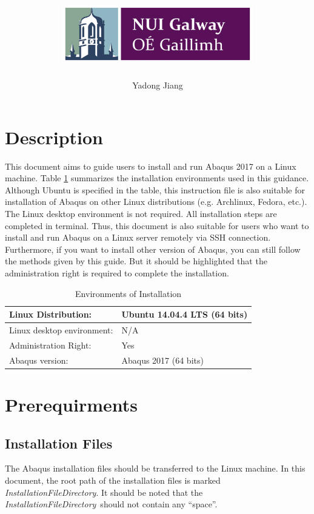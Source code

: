 \documentclass[12pt]{article}
\title{\includegraphics[height=1in]{Figures/NUIG_Logo.jpg}\\ \tit}
\author[1]{Yadong Jiang}
\affil[1]{College of Engineering and Informatics, National University of Ireland Galway}
\date{}
\newcommand{\ifp}{\textit{InstallationFileDirectory}}
\begin{document}
\maketitle

\newpage

\section*{Description}
This document aims to guide users to install and run Abaqus 2017 on a Linux machine. Table \ref{tb-1} summarizes the installation environments used in this guidance. Although Ubuntu is specified in the table, this instruction file is also suitable for installation of Abaqus on other Linux distributions (e.g. Archlinux, Fedora, etc.). The Linux desktop environment is not required. All installation steps are completed in terminal. Thus, this document is also suitable for users who want to install and run Abaqus on a Linux server remotely via SSH connection. Furthermore, if you want to install other version of Abaqus, you can still follow the methods given by this guide. But it should be highlighted that the administration right is required to complete the installation.

\begin{table}[h!]
\caption{Environments of Installation}
\begin{center}
\begin{tabular}{l l}
    \hline
    Linux Distribution: & Ubuntu 14.04.4 LTS (64 bits)\\
    \hline
    Linux desktop environment: & N/A \\
    \hline
    Administration Right: & Yes \\
    \hline
    Abaqus version: & Abaqus 2017 (64 bits) \\
    \hline
\end{tabular}
\end{center}
\label{tb-1}
\end{table}

\section*{Prerequirments}
\subsection*{Installation Files}
The Abaqus installation files should be transferred to the Linux machine. In this document, the root path of the installation files is marked \ifp. It should be noted that the \ifp\ should not contain any ``space''.
\end{document}
